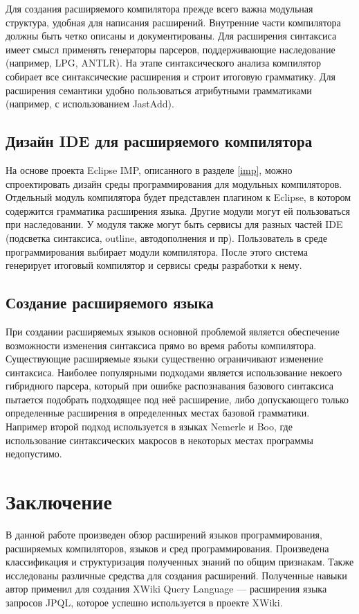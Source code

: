 \documentclass[a4paper,12pt,titlepage]{extarticle}
\begin{document}
Для создания расширяемого компилятора прежде всего важна модульная структура,
удобная для написания расширений. Внутренние части компилятора должны быть
четко описаны и документированы.
Для расширения синтаксиса имеет смысл применять генераторы парсеров,
поддерживающие наследование (например, LPG, ANTLR).
На этапе синтаксического анализа компилятор собирает все синтаксические
расширения и строит итоговую грамматику.
Для расширения семантики удобно пользоваться атрибутными грамматиками
(например, с использованием JastAdd).

\subsection{Дизайн IDE для расширяемого компилятора}

На основе проекта Eclipse IMP, описанного в разделе \ref{imp}, можно
спроектировать дизайн среды программирования для модульных компиляторов.
Отдельный модуль компилятора будет представлен плагином к Eclipse, в котором
содержится грамматика расширения языка. Другие модули могут ей
пользоваться при наследовании. У модуля также могут быть сервисы для разных
частей IDE (подсветка синтаксиса, outline, автодополнения и пр).
Пользователь в среде программирования выбирает модули компилятора. После этого
система генерирует итоговый компилятор и сервисы среды разработки к нему.

\subsection{Создание расширяемого языка}

При создании расширяемых языков основной проблемой является
обеспечение возможности изменения синтаксиса прямо во время работы
компилятора.
Существующие расширяемые языки существенно ограничивают изменение синтаксиса.
Наиболее популярными подходами является использование некоего
гибридного парсера, который при ошибке распознавания базового синтаксиса
пытается подобрать подходящее под неё расширение, либо допускающего только
определенные расширения в определенных местах базовой грамматики. Например
второй подход используется в языках Nemerle и Boo, где
использование синтаксических макросов в некоторых местах программы недопустимо.

\section{Заключение}

В данной работе произведен обзор расширений языков программирования,
расширяемых компиляторов, языков и сред программирования. Произведена
классификация и структуризация полученных знаний по общим признакам.  Также
исследованы различные средства для создания расширений.
Полученные навыки автор применил для создания XWiki Query
Language\cite{xwql} --- расширения языка запросов JPQL, которое успешно
используется в проекте XWiki.

\small



\end{document}
